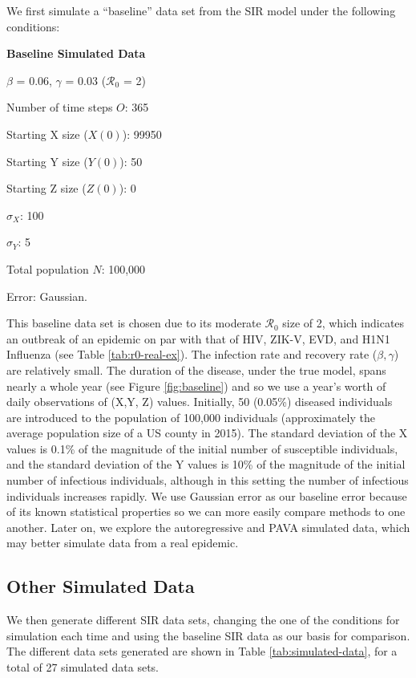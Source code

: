 \documentclass[12pt]{article}
\newcommand{\rr}{\ensuremath{\mathcal{R}_0}}
\begin{document}
We first simulate a ``baseline'' data set from the SIR model under the following conditions: 

\textbf{Baseline Simulated Data}
\begin{center}
	
	$\beta$ = 0.06, $\gamma$ = 0.03 ($\rr$ = 2)
	
	Number of time steps $O$: 365
	
	Starting X size ($X(0)$): 99950
	
	Starting Y size ($Y(0)$): 50
	
	Starting Z size ($Z(0)$): 0 
	
	$\sigma_X$: 100
	
	$\sigma_Y$: 5
	
	Total population $N$: 100,000

        Error: Gaussian.
	
      \end{center}

      This baseline data set is chosen due to its moderate $\rr$ size of 2, which indicates an outbreak of an epidemic on par with that of HIV, ZIK-V, EVD, and H1N1 Influenza (see Table \ref{tab:r0-real-ex}).  The infection rate and recovery rate ($\beta, \gamma$) are relatively small.  The duration of the disease, under the true model, spans nearly a whole year (see Figure \ref{fig:baseline}) and so we use a year's worth of daily observations of (X,Y, Z) values.  Initially, 50 (0.05\%) diseased individuals are introduced to the population of 100,000 individuals (approximately the average population size of a US county in 2015).  The standard deviation of the X values is 0.1\% of the magnitude of the initial number of susceptible individuals, and the standard deviation of the Y values is 10\% of the magnitude of the initial number of infectious individuals, although in this setting the number of infectious individuals increases rapidly.  We use Gaussian error as our baseline error because of its known statistical properties so we can more easily compare methods to one another.  Later on, we explore the autoregressive and PAVA simulated data, which may better simulate data from  a real epidemic.

      \subsection{Other Simulated Data}

We then generate different SIR data sets, changing the one of the conditions for simulation each time and using the baseline SIR data as our basis for comparison. The different data sets generated are shown in Table \ref{tab:simulated-data}, for a total of 27 simulated data sets.
\end{document}
